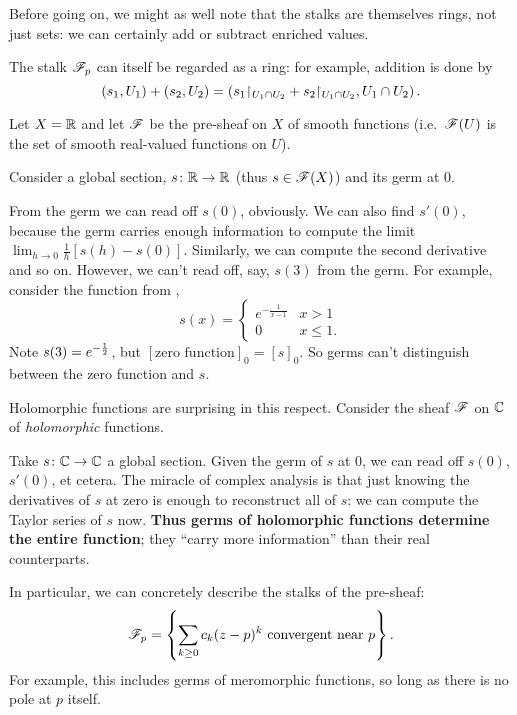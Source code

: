 Before going on,
we might as well note that the stalks are themselves rings,
not just sets: we can certainly add or subtract enriched values.
\begin{definition}
	The stalk $\mathscr F_p$ can itself be regarded as a ring:
	for example, addition is done by
	\[
		\left( s_1, U_1 \right) + \left( s_2, U_2 \right)
		= \left( s_1 \restrict{U_1 \cap U_2} + s_2 \restrict{U_1 \cap U_2},
		U_1 \cap U_2 \right).
	\]
\end{definition}

\begin{example}
	Let $X = \mathbb R$ and let $\mathscr F$ be the pre-sheaf on $X$ of smooth functions
	(i.e.\ $\mathscr F(U)$ is the set of smooth real-valued functions on $U$).

	Consider a global section, $s \colon \mathbb R \to \mathbb R$ (thus $s \in \mathscr F(X)$)
	and its germ at $0$.
	\begin{enumerate}[(a)]
		\ii From the germ we can read off $s(0)$, obviously.
		\ii We can also find $s'(0)$, because the germ carries enough
		information to compute the limit $\lim_{h \to 0} \frac1h[s(h)-s(0)]$.
		\ii Similarly, we can compute the second derivative and so on.
		\ii However, we can't read off, say, $s(3)$ from the germ.
		For example, consider the function from ,
		\[
			s(x) = \begin{cases}
				e^{-\frac{1}{x-1}} & x > 1 \\
				0 & x \le 1.
			\end{cases}
		\]
		Note $s(3) = e^{-\frac{1}{2}}$, but $[\text{zero function}]_0 = [s]_0$.
		So germs can't distinguish between the zero function and $s$.
	\end{enumerate}
\end{example}

\begin{example}
	Holomorphic functions are surprising in this respect.
	Consider the sheaf $\mathscr F$ on $\mathbb C$ of \emph{holomorphic} functions.

	Take $s \colon \mathbb C \to \mathbb C$ a global section.
	Given the germ of $s$ at $0$, we can read off $s(0)$, $s'(0)$, et cetera.
	The miracle of complex analysis is that just knowing
	the derivatives of $s$ at zero is enough to reconstruct all of $s$:
	we can compute the Taylor series of $s$ now.
	\textbf{Thus germs of holomorphic functions determine the entire function};
	they ``carry more information'' than their real counterparts.

	In particular, we can concretely describe the stalks of the pre-sheaf:
	\[
		\mathscr F_p = \left\{
			\sum_{k \ge 0} c_k (z-p)^k
			\text{ convergent near $p$}
		\right\}.
	\]
	For example, this includes germs of meromorphic functions,
	so long as there is no pole at $p$ itself.
\end{example}

